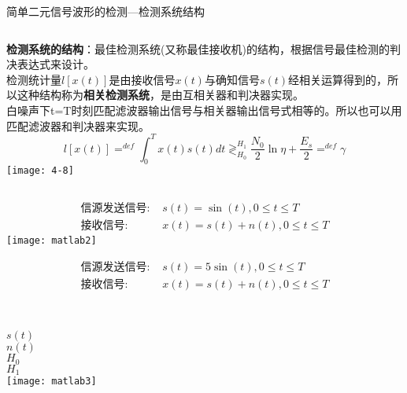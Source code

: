 \begin{frame}{简单二元信号波形的检测---检测系统结构}
\begin{columns}
	\small
	\textbf{检测系统的结构}：最佳检测系统(又称最佳接收机)的结构，根据信号最佳检测的判决表达式来设计。\\
	检测统计量$l[x(t)]$是由接收信号$x(t)$与确知信号$s(t)$经相关运算得到的，所以这种结构称为\textbf{相关检测系统}，是由互相关器和判决器实现。\\
	白噪声下t=T时刻匹配滤波器输出信号与相关器输出信号式相等的。所以也可以用匹配滤波器和判决器来实现。
	\[l[x(t)]\mathop{=}^{def}\int_{0}^{T}x(t)s(t)dt\mathop{\gtrless}_{H_0}^{H_1}\frac{N_0}{2}\ln\eta+\frac{E_s}{2}\mathop{=}^{def}\gamma\]
	\texttt{[image: 4-8]}
\end{columns}
\end{frame}

\begin{frame}[shrink]
\begin{align*}
\text{信源发送信号: } &s(t)=\sin(t),0 \le t\le T\\
\text{接收信号: } &x(t)=s(t)+n(t), 0\le t\le T
\end{align*}
\centering
\texttt{[image: matlab2]}
\end{frame}

\begin{frame}[shrink]
\begin{align*}
\text{信源发送信号: } &s(t)=5\sin(t),0 \le t\le T\\
\text{接收信号: } &x(t)=s(t)+n(t), 0\le t\le T
\end{align*}
\begin{columns}%
	~\\
	\vspace{0.2cm}
	$s(t)$\\
	\vspace{0.5cm}
	$n(t)$\\
	\vspace{0.5cm}
	$H_0$\\
	\vspace{0.5cm}
	$H_1$\\
	\texttt{[image: matlab3]}
\end{columns}
\end{frame}

